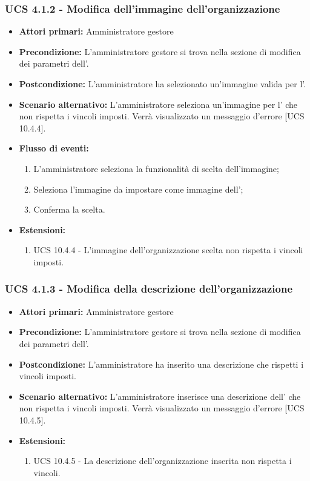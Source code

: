 \subsubsection{UCS 4.1.2 - Modifica dell'immagine dell'organizzazione}%
\begin{itemize}
\item \textbf{Attori primari:} Amministratore gestore
\item \textbf{Precondizione:} L'amministratore gestore si trova nella sezione di modifica dei parametri dell'.
\item \textbf{Postcondizione:} L'amministratore ha selezionato un'immagine valida per l'.
\item \textbf{Scenario alternativo:} L'amministratore seleziona un'immagine per l' che non rispetta i vincoli imposti. Verrà visualizzato un messaggio d'errore [UCS 10.4.4].
\item \textbf{Flusso di eventi:}
\begin{enumerate}
    \item L'amministratore seleziona la funzionalità di scelta dell'immagine;
    \item Seleziona l'immagine da impostare come immagine dell';
    \item Conferma la scelta.
\end{enumerate}
\item \textbf{Estensioni:}
\begin{enumerate}
    \item UCS 10.4.4 - L'immagine dell'organizzazione scelta non rispetta i vincoli imposti.
\end{enumerate}
\end{itemize}

\subsubsection{UCS 4.1.3 - Modifica della descrizione dell'organizzazione}%
\begin{itemize}
\item \textbf{Attori primari:} Amministratore gestore
\item \textbf{Precondizione:} L'amministratore gestore si trova nella sezione di modifica dei parametri dell'.
\item \textbf{Postcondizione:} L'amministratore ha inserito una descrizione che rispetti i vincoli imposti.
\item \textbf{Scenario alternativo:} L'amministratore inserisce una descrizione dell' che non rispetta i vincoli imposti. Verrà visualizzato un messaggio d'errore [UCS 10.4.5].
\item \textbf{Estensioni:}
\begin{enumerate}
    \item UCS 10.4.5 - La descrizione dell'organizzazione inserita non rispetta i vincoli.
\end{enumerate}
\end{itemize}


